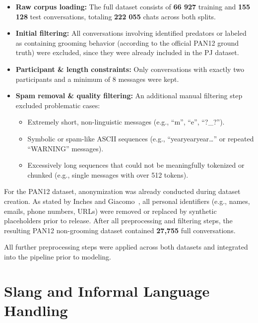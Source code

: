 \begin{itemize}
    \item \textbf{Raw corpus loading:} The full dataset consists of \textbf{66 927} training and \textbf{155 128} test conversations, totaling \textbf{222 055} chats across both splits.
    \item \textbf{Initial filtering:} All conversations involving identified predators or labeled as containing grooming behavior (according to the official PAN12 ground truth) were excluded, since they were already included in the PJ dataset.
    \item \textbf{Participant \& length constraints:} Only conversations with exactly two participants and a minimum of 8 messages were kept.
    \item \textbf{Spam removal \& quality filtering:} An additional manual filtering step excluded problematic cases:
    \begin{itemize}
        \item Extremely short, non-linguistic messages (e.g., \enquote{m}, \enquote{e}, \enquote{?\_?}).
        \item Symbolic or spam-like ASCII sequences (e.g., \enquote{yearyearyear\ldots} or repeated \enquote{WARNING} messages).
        \item Excessively long sequences that could not be meaningfully tokenized or chunked (e.g., single messages with over 512 tokens).
    \end{itemize}
\end{itemize}

For the PAN12 dataset, anonymization was already conducted during dataset creation. As stated by Inches and Giacomo~\cite{inches2012pan}, all personal identifiers (e.g., names, emails, phone numbers, URLs) were removed or replaced by synthetic placeholders prior to release. After all preprocessing and filtering steps, the resulting PAN12 non-grooming dataset contained \textbf{27,755} full conversations.

All further preprocessing steps were applied across both datasets and integrated into the pipeline prior to modeling.

\section{Slang and Informal Language Handling}

